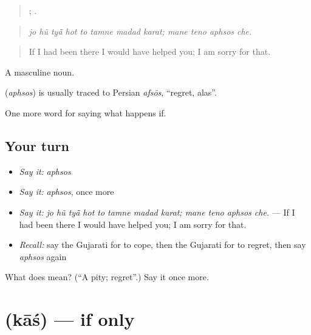 \begin{quote}
       ;    .
\end{quote}

\begin{quote}
\emph{jo hũ tyā̃ hot to tamne madad karat; mane teno aphsos che.}
\end{quote}

\begin{quote}
If I had been there I would have helped you; I am sorry for that.
\end{quote}

A masculine noun.

\begin{cousinweb}
\textbf{} (\emph{aphsos}) is usually traced to Persian \emph{afsōs}, \textquotedblleft{}regret, alas\textquotedblright{}.
\end{cousinweb}

\begin{grammarlens}[title={What you've built}]
One more word for saying what happens if.
\end{grammarlens}

\subsection*{Your turn}
\begin{itemize}
\raggedright
  \item \emph{Say it:} \emph{aphsos}
  \item \emph{Say it:} \emph{aphsos}, once more
  \item \emph{Say it:} \emph{jo hũ tyā̃ hot to tamne madad karat; mane teno aphsos che.} — If I had been there I would have helped you; I am sorry for that.
  \item \emph{Recall:} say the Gujarati for to cope, then the Gujarati for to regret, then say \emph{aphsos} again
\end{itemize}

\begin{tcolorbox}[breakable,colback=teal!4,colframe=teal!35!black,title={Before you move on}]
What does  mean? (\textquotedblleft{}A pity; regret\textquotedblright{}.) Say it once more.
\end{tcolorbox}
\section[\texorpdfstring{\gu{કાશ} (kāś)}{કાશ (kāś)}]{ (kāś) — if only}

